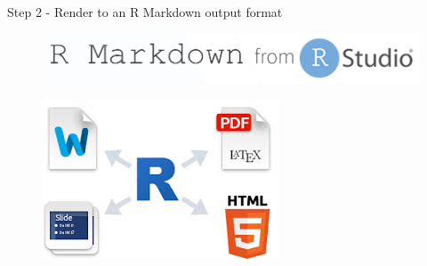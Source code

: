 \documentclass[final]{beamer}
\begin{document}
\begin{frame}[fragile]
\begin{columns}[t]
\begin{column}{0.31\linewidth}
\begin{minipage}[t][.955\textheight]{\linewidth}
\vspace{0ex}
\begin{block}{Step 2 - Render to an R Markdown output format}
\vspace{3ex}
\begin{figure}
\includegraphics[width=0.98\linewidth]{images/RMarkdown.png}
\end{figure}
\vspace{0ex}
\begin{figure}
\includegraphics[width=0.98\linewidth]{images/RMarkdownOutput4way.png}
\end{figure}
\vspace{1ex}
\end{block}


\end{minipage}
\end{column}
\end{columns}
\end{frame}
\end{document}
